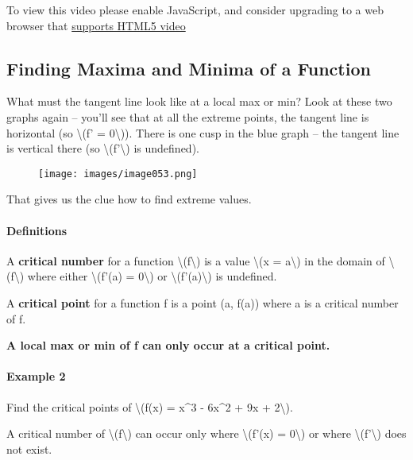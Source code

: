 To view this video please enable JavaScript, and consider upgrading to a
web browser that \href{http://videojs.com/html5-video-support/}{supports
HTML5 video}

\hypertarget{finding-maxima-and-minima-of-a-function}{%
\subsection{Finding Maxima and Minima of a
Function}\label{finding-maxima-and-minima-of-a-function}}

What must the tangent line look like at a local max or min? Look at
these two graphs again -- you'll see that at all the extreme points, the
tangent line is horizontal (so \textbackslash{}(f' =
0\textbackslash{})). There is one cusp in the blue graph -- the tangent
line is vertical there (so \textbackslash{}(f'\textbackslash{}) is
undefined).

\begin{figure}
\centering
\texttt{[image: images/image053.png]}
\caption{}
\end{figure}

That gives us the clue how to find extreme values.

\hypertarget{definitions}{%
\paragraph{Definitions}\label{definitions}}

A \textbf{critical number} for a function
\textbackslash{}(f\textbackslash{}) is a value \textbackslash{}(x =
a\textbackslash{}) in the domain of \textbackslash{}(f\textbackslash{})
where either \textbackslash{}(f'(a) = 0\textbackslash{}) or
\textbackslash{}(f'(a)\textbackslash{}) is undefined.

A \textbf{critical point} for a function f is a point (a, f(a)) where a
is a critical number of f.

\textbf{A local max or min of f can only occur at a critical point.}

\hypertarget{example-2}{%
\paragraph{Example 2}\label{example-2}}

Find the critical points of \textbackslash{}(f(x) = x\^{}3 - 6x\^{}2 +
9x + 2\textbackslash{}).

A critical number of \textbackslash{}(f\textbackslash{}) can occur only
where \textbackslash{}(f'(x) = 0\textbackslash{}) or where
\textbackslash{}(f'\textbackslash{}) does not exist.

